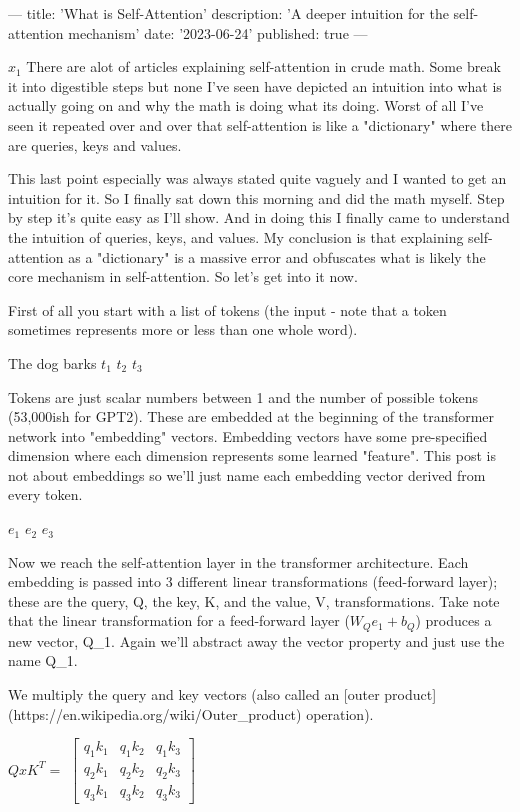 ---
title: 'What is Self-Attention'
description: 'A deeper intuition for the self-attention mechanism'
date: '2023-06-24'
published: true
---

$ x_1 $
There are alot of articles explaining self-attention in crude math. Some break it into digestible steps but none I've seen have depicted an intuition into what is actually going on and why the math is doing what its doing. Worst of all I've seen it repeated over and over that self-attention is like a "dictionary" where there are queries, keys and values.

This last point especially was always stated quite vaguely and I wanted to get an intuition for it. So I finally sat down this morning and did the math myself. Step by step it's quite easy as I'll show. And in doing this I finally came to understand the intuition of queries, keys, and values. My conclusion is that explaining self-attention as a "dictionary" is a massive error and obfuscates what is likely the core mechanism in self-attention. So let's get into it now.

First of all you start with a list of tokens (the input - note that a token sometimes represents more or less than one whole word).

The dog barks
$t_1$ $t_2$ $t_3$

Tokens are just scalar numbers between 1 and the number of possible tokens (53,000ish for GPT2). These are embedded at the beginning of the transformer network into "embedding" vectors. Embedding vectors have some pre-specified dimension where each dimension represents some learned "feature". This post is not about embeddings so we'll just name each embedding vector derived from every token.

$e_1$ $e_2$ $e_3$

Now we reach the self-attention layer in the transformer architecture. Each embedding is passed into 3 different linear transformations (feed-forward layer); these are the query, Q, the key, K, and the value, V, transformations. Take note that the linear transformation for a feed-forward layer ($W_Q e_1 + b_Q$) produces a new vector, Q_1. Again we'll abstract away the vector property and just use the name Q_1.

We multiply the query and key vectors (also called an [outer product](https://en.wikipedia.org/wiki/Outer_product) operation).

$Q x K^T = $
\(
\begin{bmatrix}
    q_1 k_1 & q_1 k_2 & q_1 k_3 \\
    q_2 k_1 & q_2 k_2 & q_2 k_3 \\
    q_3 k_1 & q_3 k_2 & q_3 k_3
\end{bmatrix}
\)

